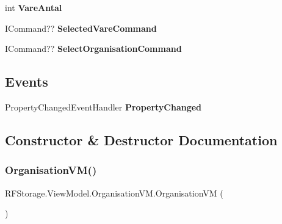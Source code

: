 \begin{DoxyCompactItemize}
int {\bfseries Vare\+Antal}
\item 
\mbox{\label{class_r_f_storage_1_1_view_model_1_1_organisation_v_m_aed95554c00b1c24dbbb4db04b175ff9d}} 
I\+Command?? {\bfseries Selected\+Vare\+Command}
\item 
\mbox{\label{class_r_f_storage_1_1_view_model_1_1_organisation_v_m_a757f1401e62b7934a54380514dc082f8}} 
I\+Command?? {\bfseries Select\+Organisation\+Command}
\end{DoxyCompactItemize}
\subsection*{Events}
\begin{DoxyCompactItemize}
\item 
\mbox{\label{class_r_f_storage_1_1_view_model_1_1_organisation_v_m_a02a2466709a41a0bf8e82f3af93181fa}} 
Property\+Changed\+Event\+Handler {\bfseries Property\+Changed}
\end{DoxyCompactItemize}


\subsection{Constructor \& Destructor Documentation}
\mbox{\label{class_r_f_storage_1_1_view_model_1_1_organisation_v_m_ad360a4cd203de421d6ccf82e7745ee52}} 
\subsubsection{\texorpdfstring{OrganisationVM()}{OrganisationVM()}}
{\footnotesize\ttfamily R\+F\+Storage.\+View\+Model.\+Organisation\+V\+M.\+Organisation\+VM (\begin{DoxyParamCaption}{ }\end{DoxyParamCaption})}







